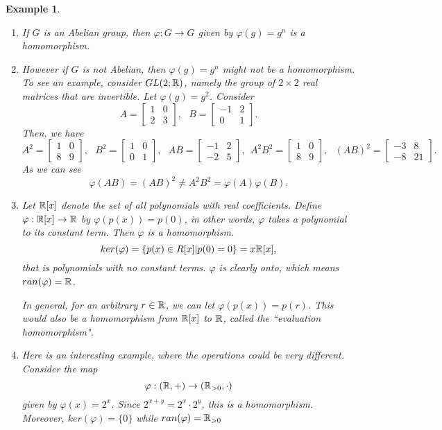 \documentclass[12pt]{article}
\theoremstyle{plain}
\newtheorem{example}{Example}
\theoremstyle{definition}
\theoremstyle{remark}
\begin{document}
\begin{example}
\begin{enumerate}
 $$ker(\varphi) = \{m\in \Z| m\equiv 0\pmod{n}\} = n\Z,$$
 while $ran(\varphi) = \Z_n$. 
 \item If $G$ is an Abelian group, then $\varphi:G\rightarrow G$ given by $\varphi(g)=g^n$ is a homomorphism.
 \item However if $G$ is not Abelian, then $\varphi(g)=g^n$ might not be a homomorphism. To see an example, consider $GL(2;\mathbb{R})$, namely the group of $2\times 2$ real matrices that are invertible. Let $\varphi(g)=g^2$. 
 Consider 
 $$ A=\begin{bmatrix}
    1&0\\
    2&3    \end{bmatrix}, \:\:\: B = \begin{bmatrix}
    -1&2\\
    0&1    \end{bmatrix}.$$
    Then, we have 
    $$A^2 = \begin{bmatrix}
    1&0\\
    8&9    \end{bmatrix}, \:\:\: B^2 = \begin{bmatrix}
    1&0\\
    0&1    \end{bmatrix}, \:\:\: AB = \begin{bmatrix}
    -1&2\\
    -2&5    \end{bmatrix}, \:\: A^2B^2 = \begin{bmatrix}
    1&0\\
    8&9    \end{bmatrix}, \:\:\: (AB)^2 = \begin{bmatrix}
    -3&8\\
    -8&21    \end{bmatrix}.$$
    As we can see $$\varphi(AB) = (AB)^2 \neq A^2B^2 =\varphi(A)\varphi(B).$$
\item Let $\mathbb{R}[x]$ denote the set of all polynomials with real coefficients. Define $\varphi:\mathbb{R}[x]\rightarrow \mathbb{R}$ by $\varphi(p(x)) = p(0)$, in other words, $\varphi$ takes a polynomial to its constant term. Then $\varphi$ is a homomorphism. 
$$ker(\varphi) = \{p(x) \in R[x]|p(0)=0\} = x\mathbb{R}[x],$$
that is polynomials with no constant terms. $\varphi$ is clearly onto, which means $ran(\varphi)=\mathbb{R}$. 

In general, for an arbitrary $r\in \mathbb{R}$, we can let $\varphi(p(x)) = p(r)$. This would also be a homomorphism from $\mathbb{R}[x]$ to $\mathbb{R}$, called the ``evaluation homomorphism".  \item Here is an interesting example, where the operations could be very different. Consider the map 
$$\varphi: \left( \mathbb{R}, +\right) \rightarrow  \left (\mathbb{R}_{>0}, \cdot \right )$$ given by 
$\varphi(x)=2^x$. Since $2^{x+y} = 2^x\cdot 2^y$, this is a homomorphism. Moreover, $ker(\varphi) = \{0\}$ while $ran(\varphi) = \mathbb{R}_{>0}$
  \end{enumerate}
\end{example}
\end{document}
